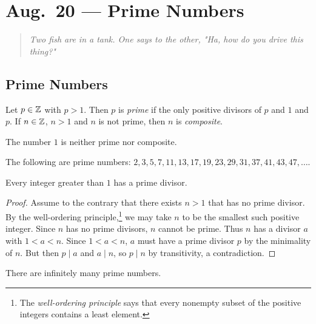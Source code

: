 \chapter{Aug.~20 --- Prime Numbers}

\begin{quote}
  \emph{Two fish are in a tank. One says to the other, "Ha, how do you drive this thing?"}
\end{quote}

\section{Prime Numbers}

\begin{definition}
  Let $p \in \mathbb{Z}$ with $p > 1$. Then $p$
  is \emph{prime} if the only positive
  divisors of $p$ and $1$ and $p$.
  If $n \in \mathbb{Z}$, $n > 1$ and $n$ is not
  prime, then $n$ is \emph{composite}.
\end{definition}

\begin{remark}
  The number $1$ is neither prime
  nor composite.
\end{remark}

\begin{example}
  The following are prime numbers:
  $2, 3, 5, 7, 11, 13, 17, 19, 23, 29, 31, 37, 41, 43, 47, \dots$.
\end{example}

\begin{lemma}\label{lem:has-prime-divisor}
  Every integer greater than $1$ has a
  prime divisor.
\end{lemma}

\begin{proof}
  Assume to the contrary that there exists
  $n > 1$ that has no prime divisor.
  By the well-ordering principle,\footnote{The \emph{well-ordering principle} says that every nonempty subset of the positive integers contains a least element.}
  we may take $n$ to be the smallest
  such positive integer. Since $n$
  has no prime divisors, $n$ cannot be
  prime. Thus $n$ has a divisor $a$
  with $1 < a < n$. Since $1 < a < n$,
  $a$ must have a prime divisor $p$ by the
  minimality of $n$. But then $p \mid a$
  and $a \mid n$, so $p \mid n$ by
  transitivity,
  a contradiction.
\end{proof}

\begin{theorem}[Euclid]
  There are infinitely many prime numbers.
\end{theorem}

